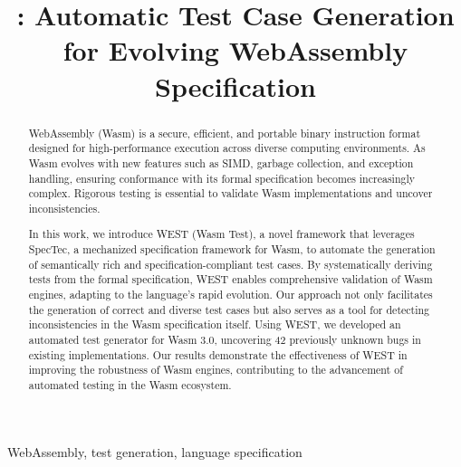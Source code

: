 \documentclass[10pt,conference]{IEEEtran}
\begin{document}
\title{\west: Automatic Test Case Generation for Evolving WebAssembly Specification}

\author{
}

\maketitle

\begin{abstract}
WebAssembly (Wasm) is a secure, efficient, and portable binary instruction format designed for high-performance execution across diverse computing environments.
As Wasm evolves with new features such as SIMD, garbage collection, and exception handling, ensuring conformance with its formal specification becomes increasingly complex.
Rigorous testing is essential to validate Wasm implementations and uncover inconsistencies.

In this work, we introduce WEST (Wasm Test), a novel framework that leverages SpecTec, a mechanized specification framework for Wasm, to automate the generation of semantically rich and specification-compliant test cases.
By systematically deriving tests from the formal specification, WEST enables comprehensive validation of Wasm engines, adapting to the language’s rapid evolution.
Our approach not only facilitates the generation of correct and diverse test cases but also serves as a tool for detecting inconsistencies in the Wasm specification itself.
Using WEST, we developed an automated test generator for Wasm 3.0, uncovering 42 previously unknown bugs in existing implementations.
Our results demonstrate the effectiveness of WEST in improving the robustness of Wasm engines, contributing to the advancement of automated testing in the Wasm ecosystem.
\end{abstract}

\begin{IEEEkeywords}
WebAssembly, test generation, language specification
\end{IEEEkeywords}




\end{document}
